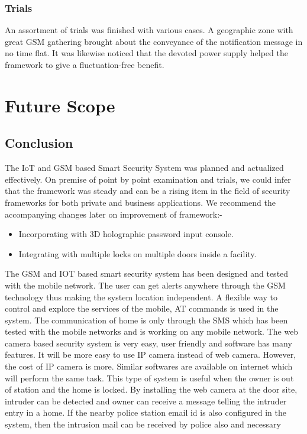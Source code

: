 \documentclass[twoside,a4paper,16pt]{book}
\begin{document}
{{  \subsection{Trials}
  An assortment of trials was finished with various cases. A geographic zone with great GSM gathering brought about the conveyance of the notification message in no time flat. It was likewise noticed that the devoted power supply helped the framework to give a fluctuation-free benefit.
 \chapter{Future Scope}
 \section{Conclusion}
 The IoT and GSM based Smart Security System was planned and actualized effectively. On premise of point by point examination and trials, we could infer that the framework was steady and can be a rising item in the field of security frameworks for both private and business applications. We recommend the accompanying changes later on improvement of framework:-
 \begin{itemize}
 	\item  Incorporating with 3D holographic password input console.
 	\item  Integrating with multiple locks on multiple doors inside a facility.
 \end{itemize}
 The GSM and IOT based smart security system has been designed and tested with the mobile
 network. The user can get alerts anywhere through the GSM technology thus making the
 system location independent. A flexible way to control and explore the services of the mobile,
 AT commands is used in the system. The communication of home is only through the SMS
 which has been tested with the mobile networks and is working on any mobile network.
 The web camera based security system is very easy, user friendly and software has many
 features. It will be more easy to use IP camera instead of web camera. However, the cost of IP
 camera is more. Similar softwares are available on internet which will perform the same task.
 This type of system is useful when the owner is out of station and the home is locked. By
 installing the web camera at the door site, intruder can be detected and owner can receive a
 message telling the intruder entry in a home. If the nearby police station email id is also
 configured in the system, then the intrusion mail can be received by police also and necessary
}}
\end{document}
